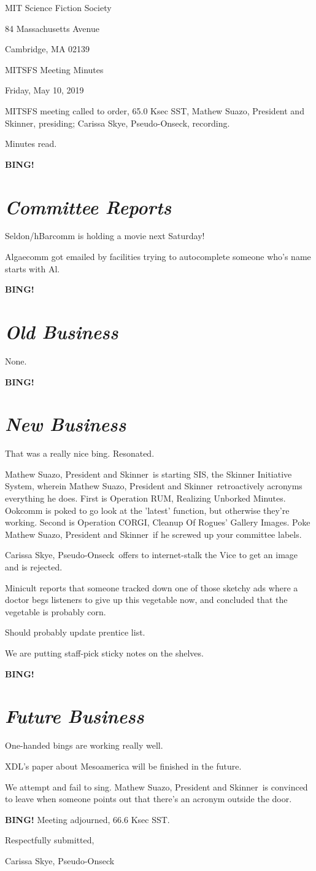 \documentclass[10pt]{article}
\newcommand{\bing}{{\bf BING!} }
\newcommand{\goto}[1]{\bing \vskip 12pt \section*{{\em{#1}}}}
\newcommand{\skinner}{Mathew Suazo, President and Skinner}
\newcommand{\onseck}{Carissa Skye, Pseudo-Onseck}
\newcommand{\meetingdate}{Friday, May 10, 2019 }
\begin{document}
\begin{center}

MIT Science Fiction Society

84 Massachusetts Avenue

Cambridge, MA 02139

\vspace{12pt}

MITSFS Meeting Minutes

\meetingdate

\end{center}

\vspace{18pt}

\setlength{\parskip}{6pt}

\noindent
MITSFS meeting called to order, 65.0 Ksec SST,
\skinner, presiding; \onseck, recording.

Minutes read.

\goto{Committee Reports}

Seldon/hBarcomm is holding a movie next Saturday!

Algaecomm got emailed by facilities trying to autocomplete someone who's name starts with Al.

\goto{Old Business}

None.

\goto{New Business}

That was a really nice bing. Resonated.

\skinner~is starting SIS, the Skinner Initiative System, wherein \skinner~retroactively acronyms everything he does. First is Operation RUM, Realizing Unborked Minutes. Ookcomm is poked to go look at the 'latest' function, but otherwise they're working. Second is Operation CORGI, Cleanup Of Rogues' Gallery Images. Poke \skinner~if he screwed up your committee labels.

\onseck~offers to internet-stalk the Vice to get an image and is rejected.

Minicult reports that someone tracked down one of those sketchy ads where a doctor begs listeners to give up this vegetable now, and concluded that the vegetable is probably corn. 

Should probably update prentice list.

We are putting staff-pick sticky notes on the shelves.

\goto{Future Business}

One-handed bings are working really well.

XDL's paper about Mesoamerica will be finished in the future.

We attempt and fail to sing. \skinner~is convinced to leave when someone points out that there's an acronym outside the door.

\bing
\noindent
Meeting adjourned, 66.6 Ksec SST.

\vspace{18pt}

\centerline{Respectfully submitted,}
\centerline{\onseck}
\end{document}
